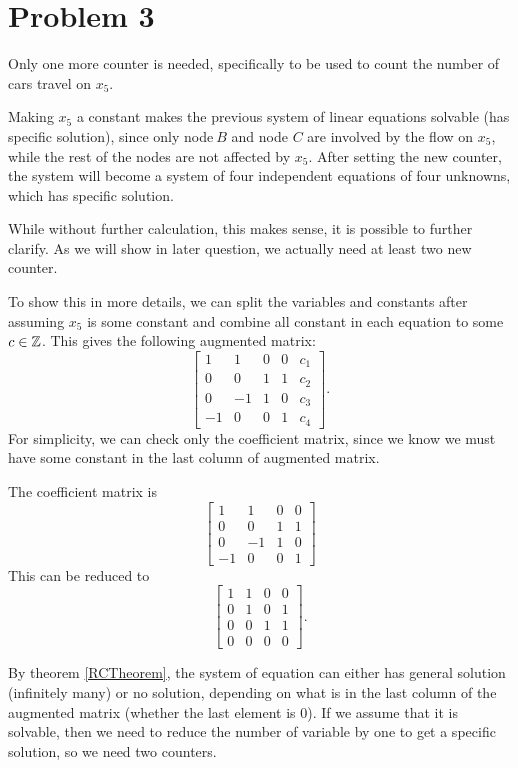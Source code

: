 \documentclass[12pt,a4paper]{article}
\begin{document}
\section*{Problem 3}
\begin{solution}
Only one more counter is needed, specifically to be used to count the number of cars travel on $\displaystyle x_{5}$.

Making $\displaystyle x_{5}$ a constant makes the previous system of linear equations solvable (has specific solution), since only node$\displaystyle \ B$ and node $\displaystyle C$ are involved by the flow on $\displaystyle x_{5}$, while the rest of the nodes are not affected by $\displaystyle x_{5}$. After setting the new counter, the system will become a system of four independent equations of four unknowns, which has specific solution.

\begin{remark}
While without further calculation, this makes sense, it is possible to further clarify. As we will show in later question, we actually need at least two new counter.

To show this in more details, we can split the variables and constants after assuming $x_5$ is some constant and combine all constant in each equation to some $c\in \mathbb{Z}$. This gives the following augmented matrix:
\begin{equation}
\left[
\begin{array}{cccc|c}
1 & 1 & 0 & 0 & c_1 \\
0 & 0 & 1 & 1 & c_2 \\
0 & -1 & 1 & 0 & c_3 \\
-1 & 0 & 0 & 1 & c_4
\end{array}
\right].
\end{equation}
For simplicity, we can check only the coefficient matrix, since we know we must have some constant in the last column of augmented matrix.

The coefficient matrix is 
\[
\begin{bmatrix}
1 & 1 & 0 & 0 \\
0 & 0 & 1 & 1 \\
0 & -1 & 1 & 0 \\
-1 & 0 & 0 & 1
\end{bmatrix}
\]
This can be reduced to
\[
\begin{bmatrix}
1 & 1 & 0 & 0 \\
0 & 1 & 0 & 1 \\
0 & 0 & 1 & 1 \\
0 & 0 & 0 & 0
\end{bmatrix}.
\]

By theorem \ref{RCTheorem}, the system of equation can either has general solution (infinitely many) or no solution, depending on what is in the last column of the augmented matrix (whether the last element is 0). If we assume that it is solvable, then we need to reduce the number of variable by one to get a specific solution, so we need two counters.
\end{remark}
\end{solution}
\end{document}
